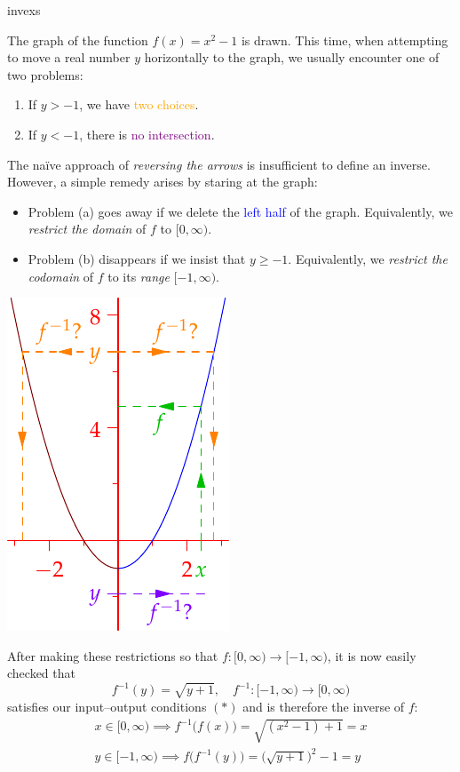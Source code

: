 \begin{examples}{}{invexs}
\begin{enumerate}
	
\begin{minipage}[t]{0.71\linewidth}\vspace{-5pt}
	\item\label{ex:invexs1} The graph of the function $f(x)=x^2-1$ is drawn. This time, when attempting to move a real number $y$ horizontally to the graph, we usually encounter one of two problems:
	\begin{enumerate}\itemsep2pt
	  \item If $y>-1$, we have \textcolor{orange}{two choices}.
	  \item If $y<-1$, there is \textcolor{Purple}{no intersection}.
	\end{enumerate}
	The naïve approach of \emph{reversing the arrows} is insufficient to define an inverse. However, a simple remedy arises by staring at the graph:
	\begin{itemize}\itemsep2pt
	  \item Problem (a) goes away if we delete the \textcolor{blue}{left half} of the graph. Equivalently, we \emph{restrict the domain} of $f$ to $[0,\infty)$. 
	  \item Problem (b) disappears if we insist that $y\ge-1$. Equivalently, we \emph{restrict the codomain} of $f$ to its \emph{range} $[-1,\infty)$. 
	\end{itemize}
\end{minipage}\hfill\begin{minipage}[t]{0.28\linewidth}\vspace{0pt}
\flushright\includegraphics{inverses-quad}
\end{minipage}\medbreak	
	After making these restrictions so that $f:[0,\infty)\to [-1,\infty)$, it is now easily checked that
	\[f^{-1}(y)=\sqrt{y+1},\quad f^{-1}:[-1,\infty)\to[0,\infty)\]
	satisfies our input--output conditions $(\ast)$ and is therefore the inverse of $f$:
	\begin{gather*}
	x\in [0,\infty)\implies f^{-1}\bigl(f(x)\bigr) =\sqrt{(x^2-1)+1}=x\\
	y\in[-1,\infty)\implies f\bigl(f^{-1}(y)\bigr)=\bigl(\sqrt{y+1}\bigr)^2-1=y
	\end{gather*}
\end{enumerate}
\end{examples}


